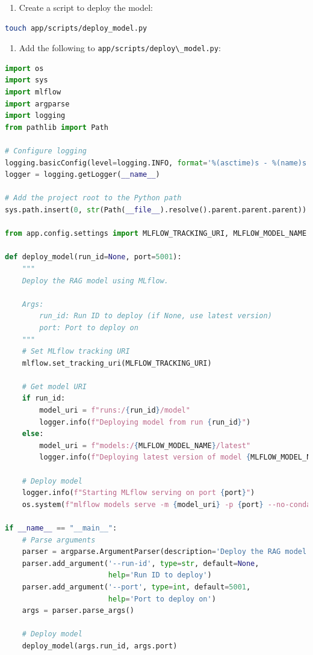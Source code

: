 \documentclass[
  screen,review,acmlarge]{acmart}
\newcommand{\passthrough}[1]{#1}
\providecommand{\tightlist}{%
  \setlength{\itemsep}{0pt}\setlength{\parskip}{0pt}}
\begin{document}
\begin{enumerate}
\def\labelenumi{\arabic{enumi}.}
\setcounter{enumi}{4}
\tightlist
\item
  Create a script to deploy the model:
\end{enumerate}

\begin{lstlisting}[language=bash]
touch app/scripts/deploy_model.py
\end{lstlisting}

\begin{enumerate}
\def\labelenumi{\arabic{enumi}.}
\setcounter{enumi}{5}
\tightlist
\item
  Add the following to \passthrough{\lstinline!app/scripts/deploy\_model.py!}:
\end{enumerate}

\begin{lstlisting}[language=Python]
import os
import sys
import mlflow
import argparse
import logging
from pathlib import Path

# Configure logging
logging.basicConfig(level=logging.INFO, format='%(asctime)s - %(name)s - %(levelname)s - %(message)s')
logger = logging.getLogger(__name__)

# Add the project root to the Python path
sys.path.insert(0, str(Path(__file__).resolve().parent.parent.parent))

from app.config.settings import MLFLOW_TRACKING_URI, MLFLOW_MODEL_NAME

def deploy_model(run_id=None, port=5001):
    """
    Deploy the RAG model using MLflow.
    
    Args:
        run_id: Run ID to deploy (if None, use latest version)
        port: Port to deploy on
    """
    # Set MLflow tracking URI
    mlflow.set_tracking_uri(MLFLOW_TRACKING_URI)
    
    # Get model URI
    if run_id:
        model_uri = f"runs:/{run_id}/model"
        logger.info(f"Deploying model from run {run_id}")
    else:
        model_uri = f"models:/{MLFLOW_MODEL_NAME}/latest"
        logger.info(f"Deploying latest version of model {MLFLOW_MODEL_NAME}")
    
    # Deploy model
    logger.info(f"Starting MLflow serving on port {port}")
    os.system(f"mlflow models serve -m {model_uri} -p {port} --no-conda")

if __name__ == "__main__":
    # Parse arguments
    parser = argparse.ArgumentParser(description='Deploy the RAG model')
    parser.add_argument('--run-id', type=str, default=None,
                        help='Run ID to deploy')
    parser.add_argument('--port', type=int, default=5001,
                        help='Port to deploy on')
    args = parser.parse_args()
    
    # Deploy model
    deploy_model(args.run_id, args.port)
\end{lstlisting}
\end{document}
